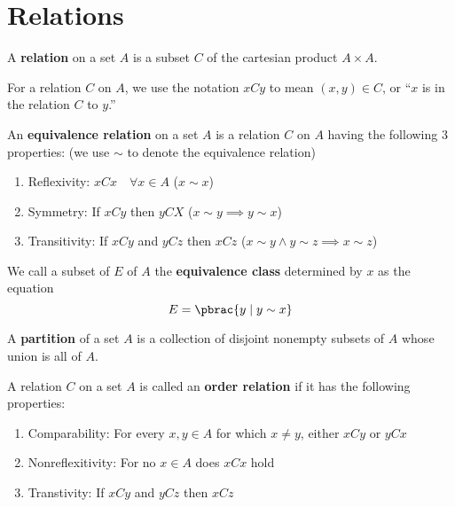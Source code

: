 \section{Relations}

\begin{definition}
  A \textbf{relation} on a set $A$ is a subset $C$ of the cartesian product $A \times A$.

  For a relation $C$ on $A$, we use the notation $xCy$ to mean $(x, y) \in C$, or ``$x$ is in the relation $C$ to $y$.''
\end{definition}

\begin{definition}
  An \textbf{equivalence relation} on a set $A$ is a relation $C$ on $A$ having the following 3 properties: (we use $\sim$ to denote the equivalence relation)
  \begin{enumerate}
    \item Reflexivity: $xCx \quad \forall x \in A$ ($x \sim x$)
    \item Symmetry: If $xCy$ then $yCX$ ($x \sim y \implies y \sim x$)
    \item Transitivity: If $xCy$ and $yCz$ then $xCz$ ($x \sim y \land y \sim z \implies x \sim z$)
  \end{enumerate}
\end{definition}

\begin{definition}
  We call a subset of $E$ of $A$ the \textbf{equivalence class} determined by $x$ as the equation
  \begin{equation}
    E = \pbrac{
      y \mid y \sim x
    }
  \end{equation}
\end{definition}

\begin{definition}
  A \textbf{partition} of a set $A$ is a collection of disjoint nonempty subsets of $A$ whose union is all of $A$.
\end{definition}

\begin{definition}
  A relation $C$ on a set $A$ is called an \textbf{order relation} if it has the following properties:
  \begin{enumerate}
    \item Comparability: For every $x, y \in A$ for which $x \neq y$, either $xCy$ or $yCx$
    \item Nonreflexitivity: For no $x \in A$ does $xCx$ hold
    \item Transtivity: If $xCy$ and $yCz$ then $xCz$
  \end{enumerate}
\end{definition}

